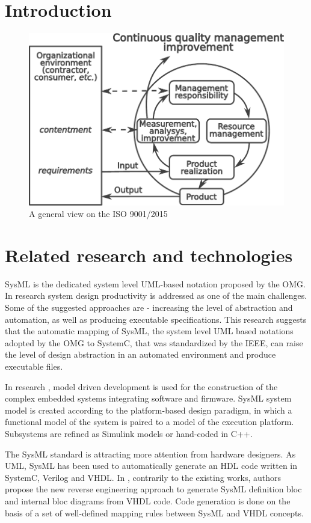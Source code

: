\documentclass{llncs}
\begin{document}
\section{Introduction}
\label{sec:intro}

\begin{figure}[htb]
  \centering
  \includegraphics[width=0.5\linewidth]{qms-pics/iso9001.pdf}
  \caption{A general view on the ISO 9001/2015}
  \label{fig:iso9001}
\end{figure}

\section{Related research and technologies}
\label{sec:related}



SysML is the dedicated system level UML-based notation proposed by the OMG. In research \cite{raslan} system design productivity is addressed as one of the main challenges. Some of the suggested approaches are - increasing the level of abstraction and automation, as well as producing executable specifications. This research suggests that the automatic mapping of SysML, the system level UML based notations adopted by the OMG to SystemC, that was standardized by the IEEE, can raise the level of design abstraction in an automated environment and produce executable files.

In research \cite{natale}, model driven development is used for the construction of  the complex embedded systems integrating software and firmware. SysML system model is created according to the platform-based design paradigm, in which a functional model of the system is paired to a model of the execution platform. Subsystems are refined as Simulink models or hand-coded in C++.

The SysML standard is attracting more attention from hardware designers. As UML, SysML has been used to automatically generate an HDL code written in SystemC, Verilog and VHDL. In \cite{boute}, contrarily to the existing works, authors propose the new reverse engineering approach to generate SysML definition bloc and internal bloc diagrams from VHDL code. Code generation is done on the basis of a set of well-defined mapping rules between SysML and VHDL concepts.
\end{document}
